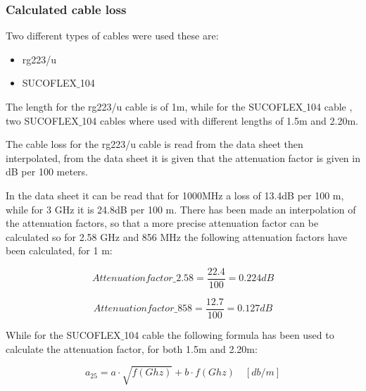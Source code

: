 \subsubsection{Calculated cable loss}
Two different types of cables were used these are:

\begin{itemize}
\item rg223/u 
\item SUCOFLEX$\_$104
\end{itemize}

The length for the  rg223/u \citep{rg} cable is of 1m, while for the SUCOFLEX$\_$104 cable \citep{sucoflex_104}, two SUCOFLEX$\_$104 cables where used with different lengths of 1.5m and 2.20m.

The cable loss for the rg223/u cable is read from the data sheet then interpolated, from the data sheet it is given that the attenuation factor is given in dB per 100 meters. 


In the data sheet it can be read that for 1000MHz a loss of  13.4dB per 100 m, while for 3 GHz it is 24.8dB per 100 m. There has been made an interpolation of the attenuation factors, so that a more precise attenuation factor can be calculated so for 2.58 GHz and 856 MHz the following attenuation factors have been calculated, for 1 m:

\begin{equation}
Attenuation factor\_2.58 = \frac{22.4}{100}  = 0.224dB
\end{equation}

\begin{equation}
Attenuation factor\_858 = \frac{12.7}{100}  = 0.127dB
\end{equation}

While for the SUCOFLEX$\_$104 cable the following formula has been used to calculate the attenuation factor, for both 1.5m and 2.20m:

\begin{equation}
a_{25} = a\cdot \sqrt{f(Ghz)} + b \cdot f(Ghz) \quad [db/m]
\end{equation}

\begin{where}
\end{where}

